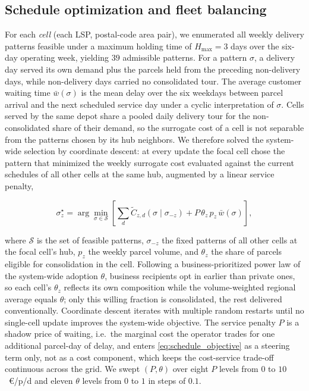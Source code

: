 \documentclass[preprint,12pt,authoryear]{elsarticle}
\begin{document}
\subsection{Schedule optimization and fleet balancing}
\label{sec:schedule_opt}

For each \emph{cell} (each LSP, postal-code area pair), we enumerated all weekly delivery patterns feasible under a maximum holding time of $H_{\max}=3$ days over the six-day operating week, yielding $39$ admissible patterns. For a pattern $\sigma$, a delivery day served its own demand plus the parcels held from the preceding non-delivery days, while non-delivery days carried no consolidated tour. The average customer waiting time $\bar{w}(\sigma)$ is the mean delay over the six weekdays between parcel arrival and the next scheduled service day under a cyclic interpretation of $\sigma$. Cells served by the same depot share a pooled daily delivery tour for the non-consolidated share of their demand, so the surrogate cost of a cell is not separable from the patterns chosen by its hub neighbors. We therefore solved the system-wide selection by coordinate descent: at every update the focal cell chose the pattern that minimized the weekly surrogate cost evaluated against the current schedules of all other cells at the same hub, augmented by a linear service penalty,

\begin{equation}
\label{eq:schedule_objective}
\sigma_z^{\star} = \arg\min_{\sigma \in \mathcal{S}} \left[ \sum_{d} \tilde{C}_{z,d}(\sigma \mid \sigma_{-z}) + P \, \theta_z \, p_z \, \bar{w}(\sigma) \right],
\end{equation}

where $\mathcal{S}$ is the set of feasible patterns, $\sigma_{-z}$ the fixed patterns of all other cells at the focal cell's hub, $p_z$ the weekly parcel volume, and $\theta_z$ the share of parcels eligible for consolidation in the cell. Following a business-prioritized power law of the system-wide adoption $\theta$, business recipients opt in earlier than private ones, so each cell's $\theta_z$ reflects its own composition while the volume-weighted regional average equals $\theta$; only this willing fraction is consolidated, the rest delivered conventionally. Coordinate descent iterates with multiple random restarts until no single-cell update improves the system-wide objective. The service penalty $P$ is a shadow price \citep{BoydVandenberghe2004} of waiting, i.e.\ the marginal cost the operator trades for one additional parcel-day of delay, and enters \eqref{eq:schedule_objective} as a steering term only, not as a cost component, which keeps the cost-service trade-off continuous across the grid. We swept $(P, \theta)$ over eight $P$ levels from $0$ to $10$~\euro/p/d and eleven $\theta$ levels from $0$ to $1$ in steps of $0.1$.
\end{document}
